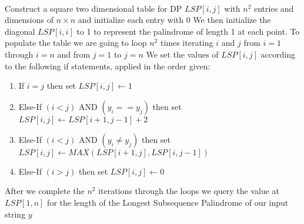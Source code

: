 \documentclass{article}
\begin{document}
\paragraph{\indent}Construct a square two dimensional table for DP \(LSP[i,j]\)
with \(n^2\) entries and dimensions of \(n \times n\)  and initialize each entry with \(0\)
We then initialize the diagonal \(LSP[i,i]\) to 1 to represent the palindrome of length 1 at each
point.
To populate the table we are going to loop \(n^2\) times iterating \(i\) and \(j\) from
\(i=1\) through \(i=n\)  and from \(j=1\) to \(j=n\)
We set the values of \(LSP[i,j]\) according to the following if statements, applied in the order given:
\begin{enumerate}
      \item If \(i=j\)  then set \(LSP[i,j] \leftarrow 1\)
      \item Else-If \((i < j)\) AND \((y_i == y_j)\)  then set \(LSP[i,j] \leftarrow LSP[i+1,j-1]+2\)
      \item Else-If \((i < j)\) AND \((y_i \neq y_j)\)  then set
            \(LSP[i,j] \leftarrow MAX(LSP[i+1,j],LSP[i,j-1])\)
      \item Else-If \((i > j)\)  then set \(LSP[i,j] \leftarrow 0\)
\end{enumerate}
After we complete the \(n^2\) iterations through the loops we query the value at \(LSP[1,n]\) for
the length of the Longest Subsequence Palindrome of our input string \(y\)
\end{document}

